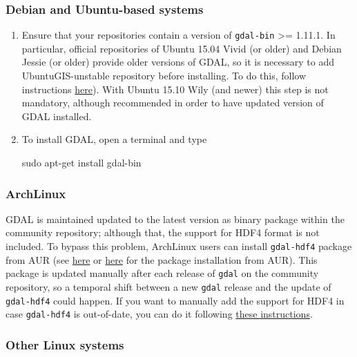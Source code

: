 \documentclass[]{article}
\newenvironment{Shaded}{\begin{snugshade}}{\end{snugshade}}
\newcommand{\FunctionTok}[1]{\textcolor[rgb]{0.00,0.00,0.00}{#1}}
\newcommand{\NormalTok}[1]{#1}
\begin{document}
\subsubsection{Debian and Ubuntu-based
systems}\label{debian-and-ubuntu-based-systems}

\begin{enumerate}
\def\labelenumi{\arabic{enumi}.}
\item
  Ensure that your repositories contain a version of \texttt{gdal-bin}
  \textgreater{}= 1.11.1. In particular, official repositories of Ubuntu
  15.04 Vivid (or older) and Debian Jessie (or older) provide older
  versions of GDAL, so it is necessary to add UbuntuGIS-unstable
  repository before installing. To do this, follow instructions
  \href{https://launchpad.net/~ubuntugis/+archive/ubuntu/ubuntugis-unstable}{here}).
  With Ubuntu 15.10 Wily (and newer) this step is not mandatory,
  although recommended in order to have updated version of GDAL
  installed.
\item
  To install GDAL, open a terminal and type

\begin{Shaded}
\begin{Highlighting}[]
\FunctionTok{sudo}\NormalTok{ apt-get install gdal-bin}
\end{Highlighting}
\end{Shaded}
\end{enumerate}

\subsubsection{ArchLinux}\label{archlinux}

GDAL is maintained updated to the latest version as binary package
within the community repository; although that, the support for HDF4
format is not included. To bypass this problem, ArchLinux users can
install \texttt{gdal-hdf4} package from AUR (see
\href{https://wiki.archlinux.org/index.php/Arch_User_Repository\#Installing_packages}{here}
or \href{https://archlinux.fr/yaourt-en}{here} for the package
installation from AUR). This package is updated manually after each
release of \texttt{gdal} on the community repository, so a temporal
shift between a new \texttt{gdal} release and the update of
\texttt{gdal-hdf4} could happen. If you want to manually add the support
for HDF4 in case \texttt{gdal-hdf4} is out-of-date, you can do it
following \href{https://notehub.org/fctdn}{these instructions}.

\subsubsection{Other Linux systems}\label{other-linux-systems}
\end{document}
